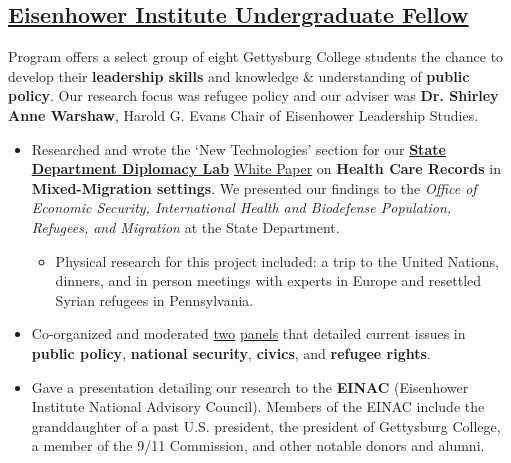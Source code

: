 \documentclass[11pt]{article}
\begin{document}
\subsection*{\underline{Eisenhower Institute Undergraduate Fellow}}
Program offers a select group of eight Gettysburg College students the chance to develop their \textbf{leadership skills} and knowledge \& understanding of \textbf{public policy}. Our research focus was refugee policy and our adviser was \textbf{Dr. Shirley Anne Warshaw}, Harold G. Evans Chair of Eisenhower Leadership Studies.
\begin{itemize}
	\item Researched and wrote the `New Technologies' section for our \href{https://www.state.gov/s/partnerships/ppp/diplab/}{\textbf{State Department Diplomacy Lab}} \href{https://drive.google.com/file/d/0B5fjh9FZOHSYT1dhVF8yYmd4UEk/view?usp=sharing}{White Paper} on \textbf{Health Care Records} in \textbf{Mixed-Migration settings}. We presented our findings to the \textit{Office of Economic Security, International Health and Biodefense Population, Refugees, and Migration} at the State Department. 
	\begin{itemize}
		\item Physical research for this project included: a trip to the United Nations, dinners, and in person meetings with experts in Europe and resettled Syrian refugees in Pennsylvania.
	\end{itemize}
	\item Co-organized and moderated \href{http://cs.gettysburg.edu/~duncjo01/assets/media/EI_panel_f16.pdf}{two} \href{http://cs.gettysburg.edu/~duncjo01/assets/media/EI_panel_s17_second.pdf}{panels} that detailed current issues in \textbf{public policy}, \textbf{national security}, \textbf{civics}, and \textbf{refugee rights}. 
	\item Gave a presentation detailing our research to the \textbf{EINAC} (Eisenhower Institute National Advisory Council). Members of the EINAC include the granddaughter of a past U.S. president, the president of Gettysburg College, a member of the 9/11 Commission, and other notable donors and alumni.
\end{itemize}
\end{document}
